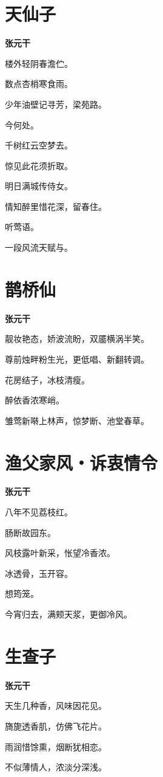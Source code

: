 \documentclass[12pt,a4paper]{ctexbook}
\begin{document}
\section{天仙子}
\textbf{张元干}\par\vspace{0.5em}
楼外轻阴春澹伫。\par
数点杏梢寒食雨。\par
少年油壁记寻芳，梁苑路。\par
今何处。\par
千树红云空梦去。\par
惊见此花须折取。\par
明日满城传侍女。\par
情知醉里惜花深，留春住。\par
听莺语。\par
一段风流天赋与。\par

\section{鹊桥仙}
\textbf{张元干}\par\vspace{0.5em}
靓妆艳态，娇波流盼，双靥横涡半笑。\par
尊前烛畔粉生光，更低唱、新翻转调。\par
花房结子，冰枝清瘦。\par
醉依香浓寒峭。\par
雏莺新啭上林声，惊梦断、池堂春草。\par

\section{渔父家风・诉衷情令}
\textbf{张元干}\par\vspace{0.5em}
八年不见荔枝红。\par
肠断故园东。\par
风枝露叶新采，怅望冷香浓。\par
冰透骨，玉开容。\par
想筠笼。\par
今宵归去，满颊天浆，更御冷风。\par

\section{生查子}
\textbf{张元干}\par\vspace{0.5em}
天生几种香，风味因花见。\par
旖旎透香肌，仿佛飞花片。\par
雨润惜馀熏，烟断犹相恋。\par
不似薄情人，浓淡分深浅。\par
\end{document}
